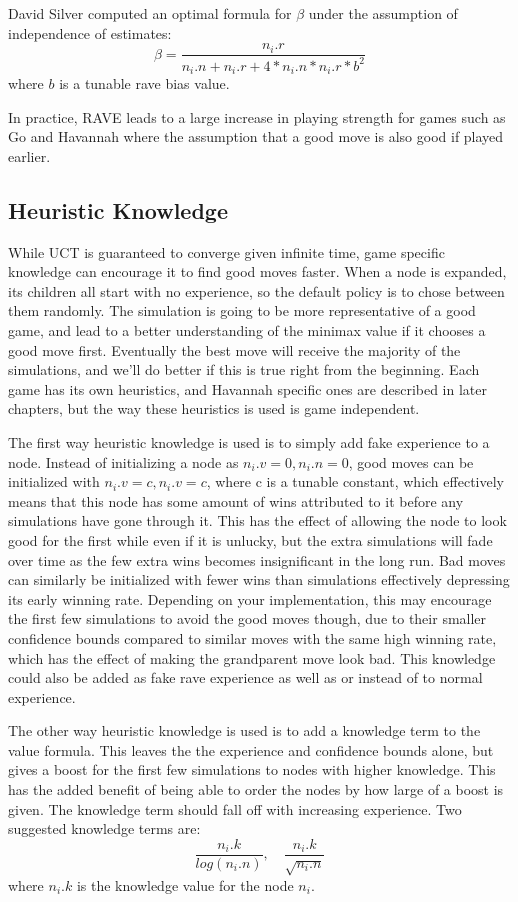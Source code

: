 David Silver computed an optimal formula for $\beta$ under the assumption of independence of estimates:
$$\beta = \frac{n_i.r}{n_i.n+n_i.r+4*n_i.n*n_i.r*b^2}$$
where $b$ is a tunable rave bias value.

In practice, RAVE leads to a large increase in playing strength for games such as Go and Havannah where the assumption that a good move is also good if played earlier.

\subsection{Heuristic Knowledge}\label{sec:heuristicknowledge}

While UCT is guaranteed to converge given infinite time, game specific knowledge can encourage it to find good moves faster. When a node is expanded, its children all start with no experience, so the default policy is to chose between them randomly. The simulation is going to be more representative of a good game, and lead to a better understanding of the minimax value if it chooses a good move first. Eventually the best move will receive the majority of the simulations, and we'll do better if this is true right from the beginning. Each game has its own heuristics, and Havannah specific ones are described in later chapters, but the way these heuristics is used is game independent.

The first way heuristic knowledge is used is to simply add fake experience to a node. Instead of initializing a node as $n_i.v = 0, n_i.n = 0$, good moves can be initialized with $n_i.v = c, n_i.v = c$, where c is a tunable constant, which effectively means that this node has some amount of wins attributed to it before any simulations have gone through it. This has the effect of allowing the node to look good for the first while even if it is unlucky, but the extra simulations will fade over time as the few extra wins becomes insignificant in the long run. Bad moves can similarly be initialized with fewer wins than simulations effectively depressing its early winning rate. Depending on your implementation, this may encourage the first few simulations to avoid the good moves though, due to their smaller confidence bounds compared to similar moves with the same high winning rate, which has the effect of making the grandparent move look bad. This knowledge could also be added as fake rave experience as well as or instead of to normal experience.

The other way heuristic knowledge is used is to add a knowledge term to the value formula. This leaves the the experience and confidence bounds alone, but gives a boost for the first few simulations to nodes with higher knowledge. This has the added benefit of being able to order the nodes by how large of a boost is given. The knowledge term should fall off with increasing experience. Two suggested knowledge terms are: $$\frac{n_i.k}{log(n_i.n)}, \quad \frac{n_i.k}{\sqrt{n_i.n}}$$ where $n_i.k$ is the knowledge value for the node $n_i$.


